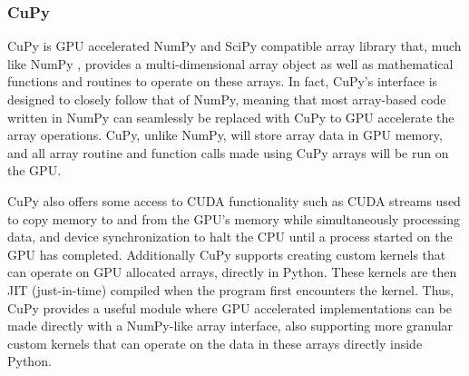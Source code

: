 \subsubsection{CuPy} \label{background:implementation_tools_and_libraries:cupy}
CuPy is GPU accelerated NumPy \cite{numpy} and SciPy \cite{scipy} compatible array library that, much like NumPy \cite{numpy}, provides a multi-dimensional array object as well as mathematical functions and routines to operate on these arrays.
In fact, CuPy's interface is designed to closely follow that of NumPy, meaning that most array-based code written in NumPy can seamlessly be replaced with CuPy to GPU accelerate the array operations.
CuPy, unlike NumPy, will store array data in GPU memory, and all array routine and function calls made using CuPy arrays will be run on the GPU.

CuPy also offers some access to CUDA functionality such as CUDA streams used to copy memory to and from the GPU's memory while simultaneously processing data, and device synchronization to halt the CPU until a process started on the GPU has completed.
Additionally CuPy supports creating custom kernels that can operate on GPU allocated arrays, directly in Python.
These kernels are then JIT (just-in-time) compiled when the program first encounters the kernel.
Thus, CuPy provides a useful module where GPU accelerated implementations can be made directly with a NumPy-like array interface, also supporting more granular custom kernels that can operate on the data in these arrays directly inside Python.
